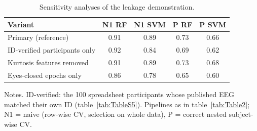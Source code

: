 \begin{table}[htbp]
\centering
\caption{Sensitivity analyses of the leakage demonstration.}
\label{tab:TableS_leak}
\footnotesize
\begin{tabular}{lcccc}
\toprule
Variant & N1 RF & N1 SVM & P RF & P SVM \\
\midrule
Primary (reference) & 0.91 & 0.89 & 0.73 & 0.66 \\
ID-verified participants only & 0.92 & 0.84 & 0.69 & 0.62 \\
Kurtosis features removed & 0.91 & 0.89 & 0.73 & 0.68 \\
Eyes-closed epochs only & 0.86 & 0.78 & 0.65 & 0.60 \\
\bottomrule
\end{tabular}
\par\smallskip
\begin{minipage}{\textwidth}\raggedright\scriptsize
Notes. ID-verified: the 100 spreadsheet participants whose published EEG matched their own ID (table~\ref{tab:TableS5}). Pipelines as in table~\ref{tab:Table2}; N1 = naive (row-wise CV, selection on whole data), P = correct nested subject-wise CV.
\end{minipage}
\end{table}
